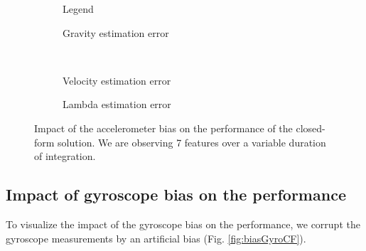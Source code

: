 \documentclass[letterpaper, 10 pt, conference]{ieeeconf}  %
\begin{document}
\begin{figure}
  \centering
        \hspace{0.2\columnwidth}%
        \begin{subfigure}[b]{0.3\columnwidth}
                \resizebox{\columnwidth}{!}{}
                \caption{Legend}

        \end{subfigure}%
        \begin{subfigure}[b]{0.5\columnwidth}
                \resizebox{\columnwidth}{!}{}
                \caption{Gravity estimation error}

        \end{subfigure}
        ~
        \begin{subfigure}[b]{0.5\columnwidth}
                \resizebox{\columnwidth}{!}{}
                \caption{Velocity estimation error}

        \end{subfigure}%
        \begin{subfigure}[b]{0.5\columnwidth}
                \resizebox{\columnwidth}{!}{}
                \caption{Lambda estimation error}

        \end{subfigure}
        \caption{Impact of the accelerometer bias on the performance of the closed-form solution. We are observing 7 features  over a variable duration of integration.\label{fig:biasAccCF}}
\end{figure}



\subsection{Impact of gyroscope bias on the performance}
To visualize the impact of the gyroscope bias on the performance,
we corrupt the gyroscope measurements by an artificial bias (Fig. \ref{fig:biasGyroCF}).

\end{document}
